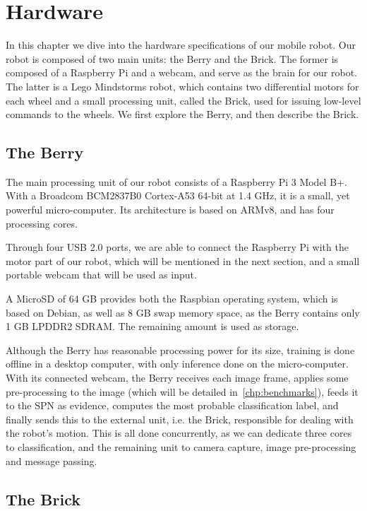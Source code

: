 
\chapter{Hardware}\label{chp:hardware}

In this chapter we dive into the hardware specifications of our mobile robot. Our robot is composed
of two main units: the Berry and the Brick. The former is composed of a Raspberry Pi and a webcam,
and serve as the brain for our robot. The latter is a Lego Mindstorms robot, which contains two
differential motors for each wheel and a small processing unit, called the Brick, used for issuing
low-level commands to the wheels. We first explore the Berry, and then describe the Brick.

\section{The Berry}

The main processing unit of our robot consists of a Raspberry Pi 3 Model B+. With a Broadcom
BCM2837B0 Cortex-A53 64-bit at 1.4 GHz, it is a small, yet powerful micro-computer. Its
architecture is based on ARMv8, and has four processing cores.

Through four USB 2.0 ports, we are able to connect the Raspberry Pi with the motor part of our
robot, which will be mentioned in the next section, and a small portable webcam that will be used
as input.

A MicroSD of 64 GB provides both the Raspbian operating system, which is based on Debian, as well as
8 GB swap memory space, as the Berry contains only 1 GB LPDDR2 SDRAM. The remaining amount is used
as storage.

Although the Berry has reasonable processing power for its size, training is done offline in a
desktop computer, with only inference done on the micro-computer. With its connected webcam, the
Berry receives each image frame, applies some pre-processing to the image (which will be detailed
in~\autoref{chp:benchmarks}), feeds it to the SPN as evidence, computes the most probable
classification label, and finally sends this to the external unit, i.e. the Brick, responsible for
dealing with the robot's motion. This is all done concurrently, as we can dedicate three cores to
classification, and the remaining unit to camera capture, image pre-processing and message passing.

\section{The Brick}

